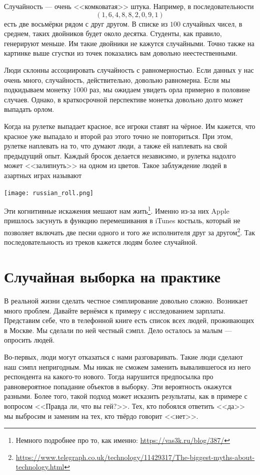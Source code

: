 \documentclass[12pt, a4paper, oneside]{article}
\begin{document}
Случайность --- очень <<комковатая>> штука. Например, в последовательности $$(1, 6, 4, 8, 8, 2, 0, 9, 1)$$ есть две восьмёрки рядом с друг другом. В списке из $100$ случайных чисел, в среднем, таких двойников будет около десятка. Студенты, как правило, генерируют меньше. Им такие двойники не кажутся случайными. Точно также на картинке выше сгустки из точек показались вам довольно неестественными. 

Люди склонны ассоциировать случайность с равномерностью. Если данных у нас очень много, случайность, действительно, довольно равномерна. Если мы подкидываем монетку $1000$ раз, мы ожидаем увидеть орла примерно в половине случаев.  Однако, в краткосрочной перспективе монетка довольно долго может выпадать орлом. 

Когда на рулетке выпадает красное, все игроки ставят на чёрное. Им кажется, что красное уже выпадало и второй раз этого точно не повториться. При этом, рулетке наплевать на то, что думают люди, а также ей наплевать на свой предыдущий опыт. Каждый бросок делается независимо, и рулетка надолго может <<залипнуть>> на одном из цветов. Такое заблуждение людей в азартных играх называют 

\begin{center}
\texttt{[image: russian\_roll.png]}
\end{center}

Эти когнитивные искажения мешают нам жить\footnote{Немного подробнее про то, как именно: \url{https://vas3k.ru/blog/387/}}. Именно из-за них Apple пришлось засунуть в функцию перемешивания в iTunes костыль, который не позволяет включать две песни одного и того же исполнителя друг за другом\footnote{\url{https://www.telegraph.co.uk/technology/11429317/The-biggest-myths-about-technology.html}}. Так последовательность из треков кажется людям более случайной.  


\section{Случайная выборка на практике} 

В реальной жизни сделать честное сэмплирование довольно сложно. Возникает много проблем. Давайте вернёмся к примеру с исследованием зарплаты. Представим себе, что в телефонной книге есть список всех людей, проживающих в Москве. Мы сделали по ней честный сэмпл. Дело осталось за малым --- опросить людей. 

Во-первых, люди могут отказаться с нами разговаривать. Такие люди сделают наш сэмпл непригодным. Мы никак не сможем заменить вывалившегося из него респондента на какого-то нового. Тогда нарушится предпосылка про равновероятное попадание объектов в выборку. Эти вероятность окажутся разными. Более того, такой подход может исказить результаты, как в примере с вопросом <<Правда ли, что вы гей?>>. Тех, кто побоялся ответить <<да>> мы выбросим и заменим на тех, кто твёрдо говорит <<нет>>. 
\end{document}
